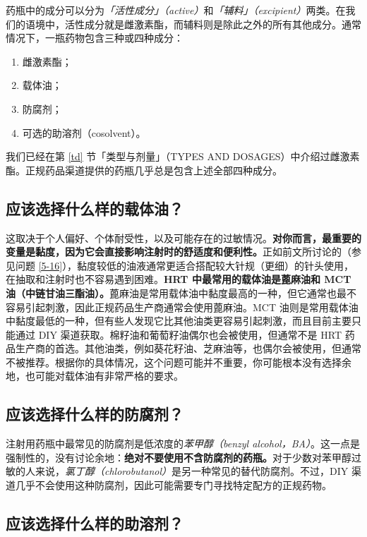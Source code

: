 \documentclass{article}
\begin{document}
药瓶中的成分可以分为\textit{「活性成分」（active）}和\textit{「辅料」（excipient）}两类。在我们的语境中，活性成分就是雌激素酯，而辅料则是除此之外的所有其他成分。通常情况下，一瓶药物包含三种或四种成分：

\begin{enumerate}
    \item 雌激素酯；
    \item 载体油；
    \item 防腐剂；
    \item 可选的助溶剂（cosolvent）。
\end{enumerate}

我们已经在第 \ref{td} 节「类型与剂量」（TYPES AND DOSAGES）中介绍过雌激素酯。正规药品渠道提供的药瓶几乎总是包含上述全部四种成分。

\subsection{应该选择什么样的载体油？}\label{6-16}

这取决于个人偏好、个体耐受性，以及可能存在的过敏情况。\textbf{对你而言，最重要的变量是黏度，因为它会直接影响注射时的舒适度和便利性。}正如前文所讨论的（参见问题 \ref{5-16}），黏度较低的油液通常更适合搭配较大针规（更细）的针头使用，在抽取和注射时也不容易遇到困难。\textbf{HRT 中最常用的载体油是蓖麻油和 MCT 油（中链甘油三酯油）。}蓖麻油是常用载体油中黏度最高的一种，但它通常也最不容易引起刺激，因此正规药品生产商通常会使用蓖麻油。MCT 油则是常用载体油中黏度最低的一种，但有些人发现它比其他油类更容易引起刺激，而且目前主要只能通过 DIY 渠道获取。棉籽油和葡萄籽油偶尔也会被使用，但通常不是 HRT 药品生产商的首选。其他油类，例如葵花籽油、芝麻油等，也偶尔会被使用，但通常不被推荐。根据你的具体情况，这个问题可能并不重要，你可能根本没有选择余地，也可能对载体油有非常严格的要求。

\subsection{应该选择什么样的防腐剂？}\label{6-17}

注射用药瓶中最常见的防腐剂是低浓度的\textit{苯甲醇（benzyl alcohol，BA）}。这一点是强制性的，没有讨论余地：\textbf{绝对不要使用不含防腐剂的药瓶。}对于少数对苯甲醇过敏的人来说，\textit{氯丁醇（chlorobutanol）}是另一种常见的替代防腐剂。不过，DIY 渠道几乎不会使用这种防腐剂，因此可能需要专门寻找特定配方的正规药物。

\subsection{应该选择什么样的助溶剂？}
\end{document}
